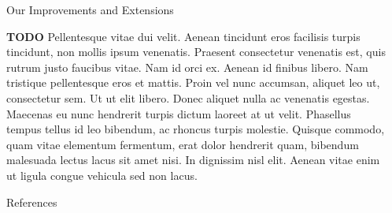 \documentclass[final,hyperref={pdfpagelabels=false}]{beamer}
\begin{document}
\begin{frame}[t]
\begin{columns}[t]
\begin{column}{.3\textwidth}
    
    \begin{block}{Our Improvements and Extensions}
    
	\textbf{TODO} Pellentesque vitae dui velit. Aenean tincidunt eros facilisis turpis tincidunt, non mollis ipsum venenatis. Praesent consectetur venenatis est, quis rutrum justo faucibus vitae. Nam id orci ex. Aenean id finibus libero. Nam tristique pellentesque eros et mattis. Proin vel nunc accumsan, aliquet leo ut, consectetur sem. Ut ut elit libero. Donec aliquet nulla ac venenatis egestas. Maecenas eu nunc hendrerit turpis dictum laoreet at ut velit. Phasellus tempus tellus id leo bibendum, ac rhoncus turpis molestie. Quisque commodo, quam vitae elementum fermentum, erat dolor hendrerit quam, bibendum malesuada lectus lacus sit amet nisi. In dignissim nisl elit. Aenean vitae enim ut ligula congue vehicula sed non lacus.    
	
	\end{block}

    \begin{block}{References}
      \nocite{*} %
      \linespread{0.928}\selectfont
      \footnotesize{
      }
    \end{block}

  \end{column} %

  \begin{column}{.02\textwidth}\end{column} %

\end{columns} %

\end{frame} %
\end{document}
